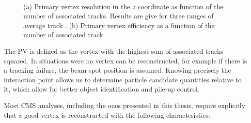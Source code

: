 \begin{figure}[htp]%
\centering
{}\qquad
{}\\
\caption[Primary vertex resolution in the $z$ coordinate and vertex reconstruction efficiency as a function of the number of constituent tracks.]{(a) Primary vertex resolution in the $z$ coordinate as function of the number of associated tracks. Results are give for three ranges of average track \pt. (b) Primary vertex efficiency as a function of the number of associated track~\cite{ARTICLE:CMSTrackingAndPrimaryVertex}}
\label{FIGURE:EventReconstructionAndSimulation_Vertex}
\end{figure}

The \gls{PV} is defined as the vertex with the highest sum of associated tracks \pt squared. In situations were no vertex can be reconstructed, for example if there is a tracking failure, the beam spot position is assumed. Knowing precisely the interaction point allows us to determine particle candidate quantities relative to it, which allow for better object identification and pile-up control. 

\newpage
Most \gls{CMS} analyses, including the ones presented in this thesis, require explicitly that a good vertex is reconstructed with the following characteristics:

